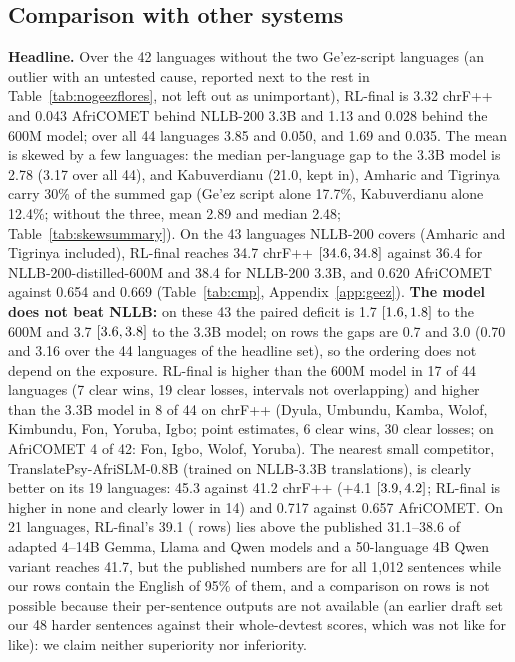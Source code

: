 \subsection{Comparison with other systems}\label{sec:cmp}
\textbf{Headline.} Over the 42 languages without the two Ge'ez-script languages (an outlier with an untested cause, reported next to the rest in Table~\ref{tab:nogeezflores}, not left out as unimportant), RL-final is 3.32 chrF++ and 0.043 AfriCOMET behind NLLB-200 3.3B and 1.13 and 0.028 behind the 600M model; over all 44 languages 3.85 and 0.050, and 1.69 and 0.035. The mean is skewed by a few languages: the median per-language gap to the 3.3B model is 2.78 (3.17 over all 44), and Kabuverdianu (21.0, kept in), Amharic and Tigrinya carry 30\% of the summed gap (Ge'ez script alone 17.7\%, Kabuverdianu alone 12.4\%; without the three, mean 2.89 and median 2.48; Table~\ref{tab:skewsummary}). On the 43 languages NLLB-200 covers (Amharic and Tigrinya included), RL-final reaches 34.7 chrF++ $[34.6, 34.8]$ against 36.4 for NLLB-200-distilled-600M and 38.4 for NLLB-200 3.3B, and 0.620 AfriCOMET against 0.654 and 0.669 (Table~\ref{tab:cmp}, Appendix~\ref{app:geez}). \textbf{The model does not beat NLLB:} on these 43 the paired deficit is 1.7 $[1.6, 1.8]$ to the 600M and 3.7 $[3.6, 3.8]$ to the 3.3B model; on \clean{} rows the gaps are 0.7 and 3.0 (0.70 and 3.16 over the 44 languages of the headline set), so the ordering does not depend on the exposure. RL-final is higher than the 600M model in 17 of 44 languages (7 clear wins, 19 clear losses, intervals not overlapping) and higher than the 3.3B model in 8 of 44 on chrF++ (Dyula, Umbundu, Kamba, Wolof, Kimbundu, Fon, Yoruba, Igbo; point estimates, 6 clear wins, 30 clear losses; on AfriCOMET 4 of 42: Fon, Igbo, Wolof, Yoruba). The nearest small competitor, TranslatePsy-AfriSLM-0.8B (trained on NLLB-3.3B translations), is clearly better on its 19 languages: 45.3 against 41.2 chrF++ (+4.1 $[3.9, 4.2]$; RL-final is higher in none and clearly lower in 14) and 0.717 against 0.657 AfriCOMET. On 21 languages, RL-final's 39.1 (\nopair{} rows) lies above the published 31.1--38.6 of adapted 4--14B Gemma, Llama and Qwen models and a 50-language 4B Qwen variant reaches 41.7, but the published numbers are for all 1,012 sentences while our rows contain the English of 95\% of them, and a comparison on \clean{} rows is not possible because their per-sentence outputs are not available (an earlier draft set our 48 harder \clean{} sentences against their whole-devtest scores, which was not like for like): we claim neither superiority nor inferiority.

